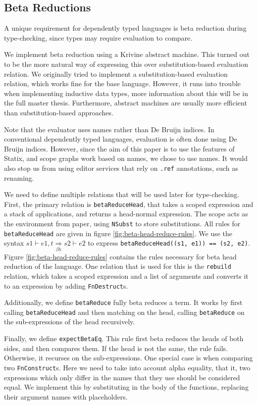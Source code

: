 \documentclass[a4paper,UKenglish,cleveref, autoref, thm-restate]{oasics-v2021}
\newcommand{\bhr}{\underset{\beta h}{\Rightarrow}}
\begin{document}
\subsection{Beta Reductions}
\label{sec:coc-dynsyms}

A unique requirement for dependently typed languages is beta reduction during type-checking, since types may require evaluation to compare.

We implement beta reduction using a Krivine abstract machine\cite{krivine}. This turned out to be the more natural way of expressing this over substitution-based evaluation relation. We originally tried to implement a substitution-based evaluation relation, which works fine for the base language. However, it runs into trouble when implementing inductive data types, more information about this will be in the full master thesis. Furthermore, abstract machines are usually more efficient than substitution-based approaches.

Note that the evaluator uses names rather than De Bruijn indices. In conventional dependently typed languages, evaluation is often done using De Bruijn indices. However, since the aim of this paper is to use the features of Statix, and scope graphs work based on names, we chose to use names. It would also stop us from using editor services that rely on \verb|.ref| annotations, such as renaming.

We need to define multiple relations that will be used later for type-checking. First, the primary relation is \verb|betaReduceHead|, that takes a scoped expression and a stack of applications, and returns a head-normal expression. The scope acts as the environment from \cite{krivine} paper, using \verb|NSubst| to store substitutions. All rules for \verb|betaReduceHead| are given in figure \ref{fig:beta-head-reduce-rules}. We use the syntax $s1 \vdash e1, t \bhr s2 \vdash e2$ to express \verb|betaReduceHead((s1, e1)) == (s2, e2)|. Figure \ref{fig:beta-head-reduce-rules} contains the rules necessary for beta head reduction of the language. One relation that is used for this is the \verb|rebuild| relation, which takes a scoped expression and a list of arguments and converts it to an expression by adding \verb|FnDestruct|s.

Additionally, we define \verb|betaReduce| fully beta reduces a term. It works by first calling \verb|betaReduceHead| and then matching on the head, calling \verb|betaReduce| on the sub-expressions of the head recursively.

Finally, we define \verb|expectBetaEq|. This rule first beta reduces the heads of both sides, and then compares them. If the head is not the same, the rule fails. Otherwise, it recurses on the sub-expressions. One special case is when comparing two \verb|FnConstruct|s. Here we need to take into account alpha equality, that it, two expressions which only differ in the names that they use should be considered equal. We implement this by substituting in the body of the functions, replacing their argument names with placeholders. 
\end{document}
